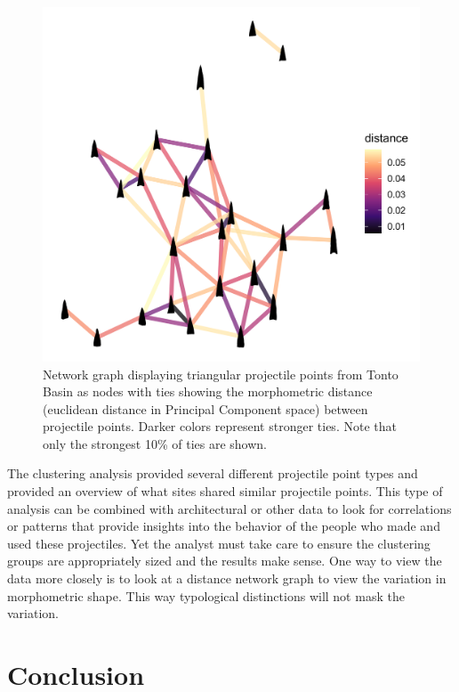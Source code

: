 \documentclass[a4paper]{article}
\begin{document}
\begin{figure}
\includegraphics[width=1\linewidth]{figures/TontoTriangularDistanceNetwork} \caption{Network graph displaying triangular projectile points from Tonto Basin as nodes with ties showing the morphometric distance (euclidean distance in Principal Component space) between projectile points. Darker colors represent stronger ties. Note that only the strongest 10\% of ties are shown.}\label{fig:TontoTriangularDistanceNetwork}
\end{figure}

The clustering analysis provided several different projectile point types and provided an overview of what sites shared similar projectile points. This type of analysis can be combined with architectural or other data to look for correlations or patterns that provide insights into the behavior of the people who made and used these projectiles. Yet the analyst must take care to ensure the clustering groups are appropriately sized and the results make sense. One way to view the data more closely is to look at a distance network graph to view the variation in morphometric shape. This way typological distinctions will not mask the variation.

\hypertarget{conclusion}{%
\section*{Conclusion}\label{conclusion}}
\end{document}
